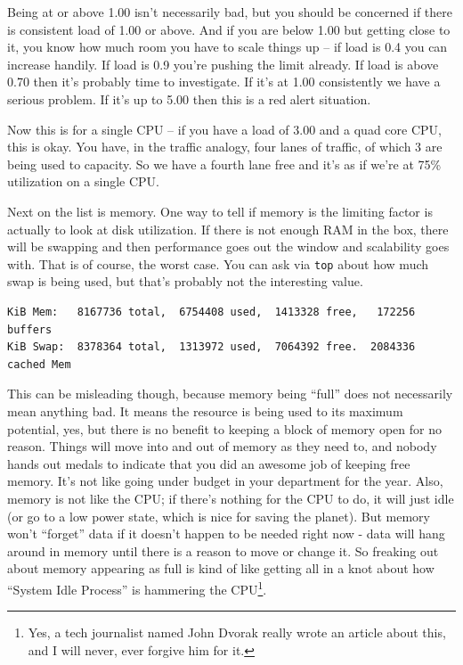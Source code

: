 \documentclass[a4paper]{report}
\begin{document}
Being at or above 1.00 isn't necessarily bad, but you should be concerned if there is consistent load of 1.00 or above. And if you are below 1.00 but getting close to it, you know how much room you have to scale things up -- if load is 0.4 you can increase handily. If load is 0.9 you're pushing the limit already. If load is above 0.70 then it's probably time to investigate. If it's at 1.00 consistently we have a serious problem. If it's up to 5.00 then this is a red alert situation.

Now this is for a single CPU -- if you have a load of 3.00 and a quad core CPU, this is okay. You have, in the traffic analogy, four lanes of traffic, of which 3 are being used to capacity. So we have a fourth lane free and it's as if we're at 75\% utilization on a single CPU.


Next on the list is memory. One way to tell if memory is the limiting factor is actually to look at disk utilization. If there is not enough RAM in the box, there will be swapping and then performance goes out the window and scalability goes with. That is of course, the worst case. You can ask via \texttt{top} about how much swap is being used, but that's probably not the interesting value. 

\begin{verbatim}
KiB Mem:   8167736 total,  6754408 used,  1413328 free,   172256 buffers
KiB Swap:  8378364 total,  1313972 used,  7064392 free.  2084336 cached Mem
\end{verbatim}

This can be misleading though, because memory being ``full'' does not necessarily mean anything bad. It means the resource is being used to its maximum potential, yes, but there is no benefit to keeping a block of memory open for no reason. Things will move into and out of memory as they need to, and nobody hands out medals to indicate that you did an awesome job of keeping free memory. It's not like going under budget in your department for the year.  Also, memory is not like the CPU; if there's nothing for the CPU to do, it will just idle (or go to a low power state, which is nice for saving the planet). But memory won't ``forget'' data if it doesn't happen to be needed right now - data will hang around in memory until there is a reason to move or change it. So freaking out about memory appearing as full is kind of like getting all in a knot about how ``System Idle Process'' is hammering the CPU\footnote{Yes, a tech journalist named John Dvorak really wrote an article about this, and I will never, ever forgive him for it.}.
\end{document}

